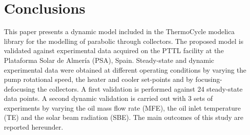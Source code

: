 \documentclass[final,3p,times,review]{elsarticle}
\begin{document}
%


%
\section{Conclusions} \label{Sec:Conclusions}
%
This paper presents a dynamic model included in the ThermoCycle modelica library for the modelling of parabolic through collectors. The proposed model is validated against experimental data acquired on the PTTL facility at the Plataforma Solar de Almer\' ia (PSA), Spain. Steady-state and dynamic experimental data were obtained at different operating conditions by varying the pump rotational speed, the heater and cooler set-points and by focusing-defocusing the collectors. A first validation is performed against 24 steady-state data points. A second dynamic validation is carried out with 3 sets of experiments by varying the oil mass flow rate (MFE), the oil inlet temperature (TE) and the solar beam radiation (SBE).
The main outcomes of this study are reported hereunder.
%
\end{document}
